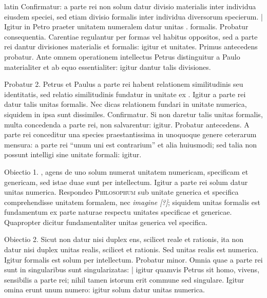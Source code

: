 \begin{otherlanguage*}{latin}
\pstart
 Confirmatur: a parte rei non solum datur divisio materialis inter individua eiusdem speciei, sed etiam divisio formalis inter individua diversorum specierum. \textnormal{|}  Igitur in Petro praeter unitatem numeralem datur unitas . formalis. Probatur consequentia. Carentiae regulantur per formas vel habitus oppositos, sed a parte rei dantur divisiones materialis et formalis: igitur et unitates. Primus antecedens probatur. Ante omnem operationem intellectus Petrus distinguitur a Paulo materialiter et ab equo essentialiter: igitur dantur talis divisiones. 
\pend

\pstart
 Probatur 2. Petrus et Paulus a parte rei habent relationem similitudinis seu identitatis, sed relatio similitudinis fundatur in unitate ex . Igitur a parte rei datur talis unitas formalis. Nec dicas relationem fundari in unitate numerica, siquidem in ipsa sunt dissimiles. Confirmatur. Si non daretur talis unitas formalis, multa concedenda a parte rei, non salvarentur: igitur. Probatur antecedens. A parte rei conceditur una species praestantissima in unoquoque genere ceterarum mensura: a parte rei \enquote{unum uni est contrarium} et alia huiusmodi; sed talia non possunt intelligi sine unitate formali: igitur. 
\pend

\pstart
 Obiectio 1. , agens de uno solum numerat unitatem numericam, specificam et genericam, sed istae duae sunt per intellectum. Igitur a parte rei solum datur unitas numerica. Respondeo \textsc{Philosophum} sub unitate generica et specifica comprehendisse unitatem formalem, nec \emph{imagine [?]}; siquidem unitas formalis est fundamentum ex parte naturae respectu unitates specificae et genericae. Quapropter dicitur fundamentaliter unitas generica vel specifica. 
\pend

\pstart
 Obiectio 2. Sicut non datur nisi duplex ens, scilicet reale et rationis, ita non datur nisi duplex unitas realis, scilicet et rationis. Sed unitas realis est numerica. Igitur formalis est solum per intellectum. Probatur minor. Omnia quae a parte rei sunt in singularibus sunt singularizatas: \textnormal{|} igitur quamvis Petrus sit homo, vivens, sensibilis a parte rei; nihil tamen istorum erit commune sed singulare. Igitur omina erunt unum numero: igitur solum datur unitas numerica. 
\pend


\end{otherlanguage*}

